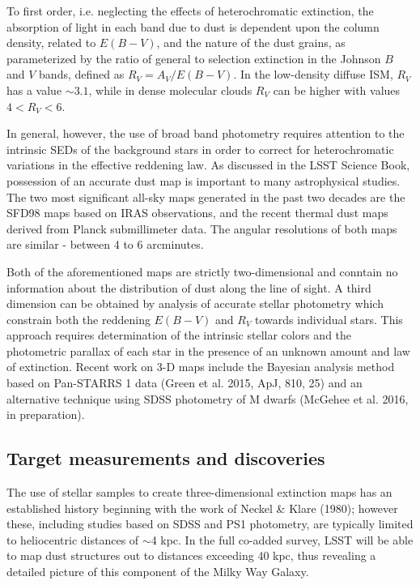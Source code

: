 To first order, i.e. neglecting the effects of heterochromatic extinction, the absorption of light
in each band due to dust is dependent upon the column density, related to $E(B-V)$, and the
nature of the dust grains, as parameterized by the ratio of general to selection extinction 
in the Johnson $B$ and $V$ bands, defined as $R_V = A_V /E(B − V)$. 
In the low-density diffuse ISM, $R_V$ has a value $\sim 3.1$, while in
dense molecular clouds $R_V$ can be higher with values $4 < R_V < 6$.

In general, however, the use of broad band photometry requires attention to the intrinsic
SEDs of the background stars in order to correct for heterochromatic variations in the
effective reddening law. As discussed in the LSST Science Book, possession of an accurate
dust map is important to many astrophysical studies. The two most significant all-sky maps generated
in the past two decades are the SFD98 maps based on IRAS observations, and the recent thermal
dust maps derived from Planck submillimeter data. The angular resolutions of both maps are similar - 
between 4 to 6 arcminutes.

Both of the aforementioned maps are strictly two-dimensional and conntain no information about the 
distribution of dust along the line of sight. A third dimension can be obtained by analysis of
accurate stellar photometry which constrain both the reddening $E(B-V)$ and $R_V$ towards 
individual stars. This approach requires determination of the intrinsic stellar colors and the photometric
parallax of each star in the presence of an unknown amount and law of extinction.
Recent work on 3-D maps include the Bayesian analysis method based on Pan-STARRS 1 data 
(Green et al. 2015, ApJ, 810, 25) and an alternative technique using SDSS photometry of 
M dwarfs (McGehee et al. 2016, in preparation). 


\subsection{Target measurements and discoveries}
\label{sec:\secname:targets}

The use of stellar samples to create three-dimensional extinction maps has an established history
beginning with the work of Neckel \& Klare (1980); however these, including studies based on SDSS and
PS1 photometry, are typically limited to heliocentric distances of $\sim$4 kpc. In the full co-added survey,
LSST will be able to map dust structures out to distances exceeding 40 kpc, thus revealing a
detailed picture of this component of the Milky Way Galaxy.

